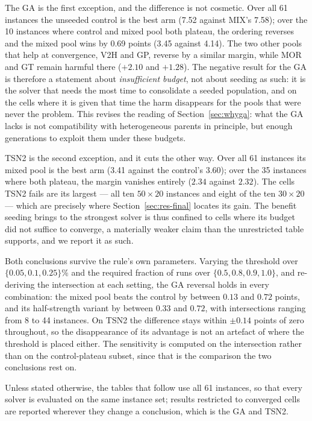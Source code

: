\documentclass[review]{elsarticle}
\begin{document}
The GA is the first exception, and the difference is not cosmetic. Over all
61 instances the unseeded control is the best arm (7.52 against MIX's
7.58); over the 10 instances where control and mixed pool both plateau, the
ordering reverses and the mixed pool wins by 0.69 points (3.45 against
4.14). The two other pools that help at convergence, V2H and GP, reverse by
a similar margin, while MOR and GT remain harmful there ($+2.10$ and
$+1.28$). The negative result for the GA is therefore a statement about
\emph{insufficient budget}, not about seeding as such: it is the solver
that needs the most time to consolidate a seeded population, and on the
cells where it is given that time the harm disappears for the pools that
were never the problem. This revises the reading of
Section~\ref{sec:whyga}: what the GA lacks is not compatibility with
heterogeneous parents in principle, but enough generations to exploit them
under these budgets.

TSN2 is the second exception, and it cuts the other way. Over all 61
instances its mixed pool is the best arm (3.41 against the control's 3.60);
over the 35 instances where both plateau, the margin vanishes entirely
($2.34$ against $2.32$). The cells TSN2 fails are its largest --- all ten
$50\times20$ instances and eight of the ten $30\times20$ --- which are
precisely where Section~\ref{sec:res-final} locates its gain. The benefit
seeding brings to the strongest solver is thus confined to cells where its
budget did not suffice to converge, a materially weaker claim than the
unrestricted table supports, and we report it as such.

Both conclusions survive the rule's own parameters. Varying the threshold
over $\{0.05, 0.1, 0.25\}\%$ and the required fraction of runs over
$\{0.5, 0.8, 0.9, 1.0\}$, and re-deriving the intersection at each setting,
the GA reversal holds in every combination: the mixed pool beats the control
by between $0.13$ and $0.72$ points, and its half-strength variant by
between $0.33$ and $0.72$, with intersections ranging from 8 to 44
instances. On TSN2 the difference stays within $\pm0.14$ points of zero
throughout, so the disappearance of its advantage is not an artefact of
where the threshold is placed either. The sensitivity is computed on the
intersection rather than on the control-plateau subset, since that is the
comparison the two conclusions rest on.

Unless stated otherwise, the tables that follow use all 61 instances, so
that every solver is evaluated on the same instance set; results restricted
to converged cells are reported wherever they change a conclusion, which is
the GA and TSN2.
\end{document}
